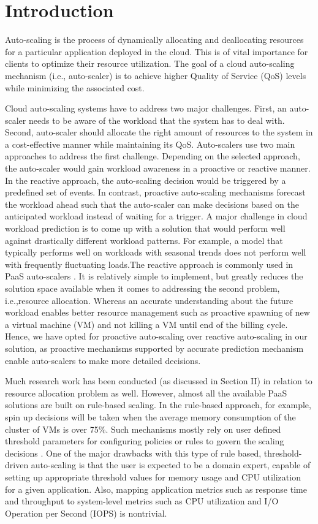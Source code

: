 \section{Introduction}
Auto-scaling is the process of dynamically allocating and deallocating resources for a particular application deployed in the cloud. This is of vital importance for clients to optimize their resource utilization. The goal of a cloud auto-scaling mechanism (i.e., auto-scaler) is to achieve higher Quality of Service (QoS) levels while minimizing the associated cost.

Cloud auto-scaling systems have to address two major challenges. First, an auto-scaler needs to be aware of the workload that the system has to deal with. Second, auto-scaler should allocate the right amount of resources to the system in a cost-effective manner while maintaining its QoS. Auto-scalers use two main approaches to address the first challenge. Depending on the selected approach, the auto-scaler would gain workload awareness in a proactive or reactive manner. In the reactive approach, the auto-scaling decision would be triggered by a predefined set of events. In contrast, proactive auto-scaling mechanisms forecast the workload ahead such that the auto-scaler can make decisions based on the anticipated workload instead of waiting for a trigger. A major challenge in cloud workload prediction is to come up with a solution that would perform well against drastically different workload patterns. For example, a model that typically performs well on workloads with seasonal trends does not perform well with frequently fluctuating loads.The reactive approach is commonly used in PaaS auto-scalers \cite{website:openshift} \cite{website:bluemix}. It is relatively simple to implement, but greatly reduces the solution space available when it comes to addressing the second problem, i.e.,resource allocation. Whereas  an accurate understanding about the future workload enables better resource management such as proactive spawning of new a virtual machine (VM) and not killing a VM until end of the billing cycle. Hence, we have opted for proactive auto-scaling over reactive auto-scaling in our solution, as proactive mechanisms supported by accurate prediction mechanism enable auto-scalers to make more detailed decisions.

Much research work has been conducted (as discussed in Section II) in relation to resource allocation problem as well. However, almost all the available PaaS solutions are built on rule-based scaling. In the rule-based approach, for example, spin up decisions will be taken when the average memory consumption of the cluster of VMs is over 75\%. Such mechanisms mostly rely on user defined threshold parameters for configuring policies or rules to govern the scaling decisions \cite{modeldriven}. One of the major drawbacks with this type of rule based, threshold-driven auto-scaling is that the user is expected to be a domain expert, capable of setting up appropriate threshold values for memory usage and CPU utilization for a given application. Also, mapping application metrics such as response time and throughput to system-level metrics such as CPU utilization and I/O Operation per Second (IOPS) is nontrivial.

